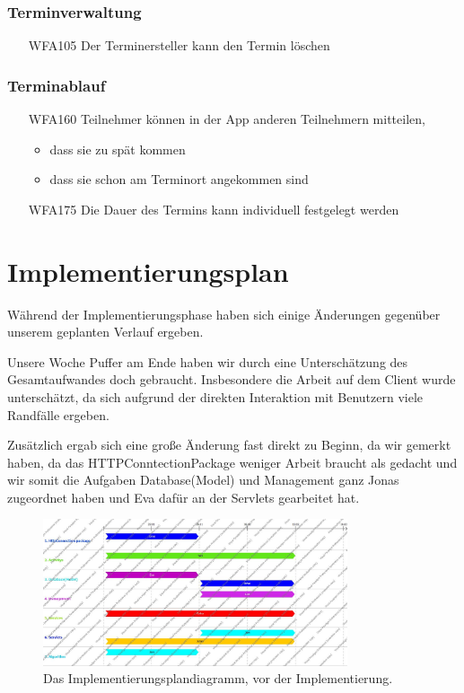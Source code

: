 \documentclass{scrartcl}
\begin{document}
	\subsubsection{Terminverwaltung}
	\begin{itemize}
		\item[WFA105] Der Terminersteller kann den Termin löschen	
	\end{itemize}

	\subsubsection{Terminablauf}
	\begin{itemize}
	\item[WFA160] Teilnehmer können in der App anderen Teilnehmern mitteilen,
		\begin{itemize}
			\item dass sie zu spät kommen
			\item dass sie schon am Terminort angekommen sind
		\end{itemize}
			\item[WFA175] Die Dauer des Termins kann individuell festgelegt werden
	\end{itemize}	

	
	\newpage
	\section{Implementierungsplan}
	Während der Implementierungsphase haben sich einige Änderungen gegenüber unserem geplanten Verlauf ergeben.
	
	Unsere Woche Puffer am Ende haben wir durch eine Unterschätzung des Gesamtaufwandes doch gebraucht. Insbesondere die Arbeit auf dem Client wurde unterschätzt, da sich aufgrund der direkten Interaktion mit Benutzern viele Randfälle ergeben.
	
	Zusätzlich ergab sich eine große Änderung fast direkt zu Beginn, da wir gemerkt haben, da das HTTPConntectionPackage weniger Arbeit braucht als gedacht und wir somit die Aufgaben Database(Model) und Management ganz Jonas zugeordnet haben und Eva dafür an der Servlets gearbeitet hat. 
	
	\begin{figure}[h]
		\centering
		\includegraphics[width=0.8\textwidth]{ImplementationPlanDiagram.jpg}
		\caption{Das Implementierungsplandiagramm, vor der Implementierung.}
	\end{figure}
\end{document}
